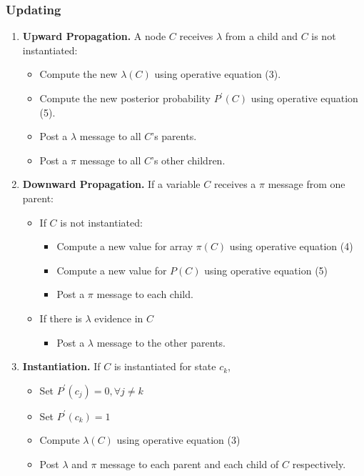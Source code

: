 \documentclass[12pt,twoside]{article}
\begin{document}
\subsubsection{Updating}
\begin{enumerate}


\item \textbf{Upward Propagation.} A node $C$ receives $\lambda$ from a child and $C$ is not instantiated: 
\begin{itemize}
	\item Compute the new $\lambda(C)$ using operative equation (3).
	\item Compute the new posterior probability $P^\prime (C)$ using operative equation (5).
	\item Post a $\lambda$ message to all $C$'s parents.
	\item Post a $\pi$ message to all $C$'s other children.
\end{itemize}


\item \textbf{Downward Propagation.} If a variable $C$ receives a $\pi$ message from one parent:
	\begin{itemize}
		\item If $C$ is not instantiated:
			\begin{itemize}
				\item Compute a new value for array $\pi(C)$ using operative equation (4)
				\item Compute a new value for $P(C)$ using operative equation (5)
				\item Post a $\pi$ message to each child.
			\end{itemize}
		
		\item If there is $\lambda$ evidence in $C$
			\begin{itemize}
				\item Post a $\lambda$ message to the other parents.
			\end{itemize}
	\end{itemize}

\item \textbf{Instantiation.} If $C$ is instantiated for state $c_k$,
\begin{itemize}
	\item Set $P^\prime (c_j) = 0, \forall j\neq k$
	\item Set $P^\prime (c_k) =1$ 
	\item Compute $\lambda (C)$ using operative equation (3)
	\item Post $\lambda$ and $\pi$ message to each parent and each child of $C$ respectively.
\end{itemize}


\end{enumerate}
\end{document}
